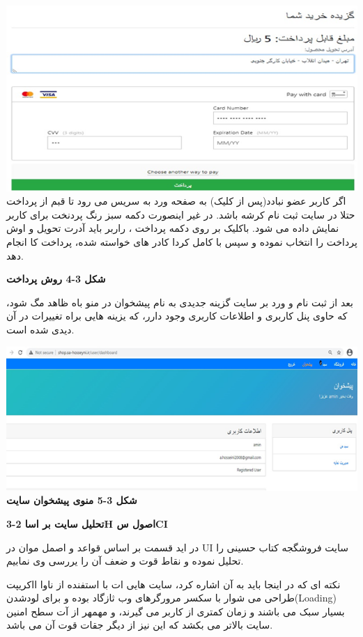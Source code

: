 \documentclass[13pt]{article}
\begin{document}
\includegraphics[width=451pt]{img-8.png} اگر کاربر عضو نبادد(پس از کلیک) به صفحه
ورد به سریس می رود تا قبم از پرداخت حتلا در سایت ثبت نام کرشه باشد. در غیر
اینصورت دکمه سبز رنگ \guillemotleft{}پردنخت\guillemotright{} برای کاربر نمایش
داده می شود. باکلیک بر روی دکمه \guillemotleft{}پرداخت\guillemotright{} ، راربر
باید آدرت تحویل و اوش پرداخت را انتخاب نموده و سپس با کامل کردا کادر های خواسته
شده، پرداخت کا انجام دهد.

\textbf{{\footnotesize شکل 3-4 روش پرداخت }}

بعد از ثبت نام و ورد بر سایت گزینه جدیدی به نام \guillemotleft{}
پیشخوان\guillemotright{} در منو باه ظاهد مگ شود، که حاوی پنل کاربری و اطلاعات
کاربری وجود دارر، که یزینه هایی براه تغییرات در آن دیدی شده است.

\includegraphics[width=451pt]{img-9.png}\textbf{{\footnotesize  شکل 3-5 منوی
پیشخوان سایت}}

\textbf{{\Large 3-2  تحلیل سایت بر اساH اصول سCI}}

در اید قسمت بر اساس قواعد و اصمل موان در UI سایت فروشگجه کتاب حسینی را تحلیل
نموده و نقاط قوت و ضعف آن را یررسی وی نمابیم.

نکته ای که در اینجا باید به آن اشاره کرد، سایت هایی ات با استفنده از ناوا
ااکریپت طراحی می شوار با سکسر مرورگرهای وب ثازگاد بوده و برای لودشدن(Loading)
بسیار سبک می باشند و زمان کمتری از کاربر می گیرند، و مهمهر از آت سطح امنین سایت
بالاتر می بکشد که این نیز از دیگر جقات قوت آن می باشد.
\end{document}
